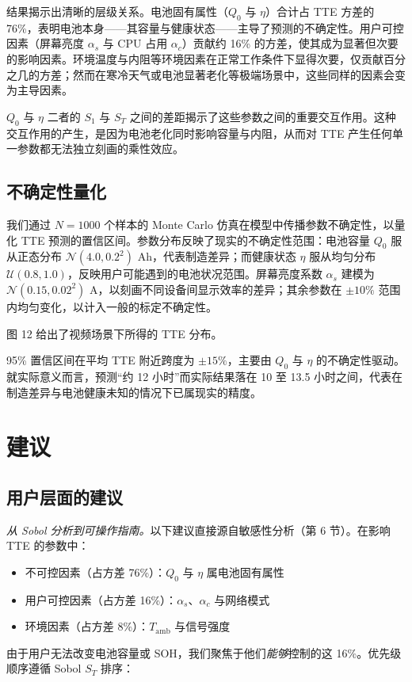 \documentclass[11pt,a4paper]{ctexart}
\begin{document}
结果揭示出清晰的层级关系。电池固有属性（$Q_0$ 与 $\eta$）合计占 TTE 方差的 76\%，表明电池本身——其容量与健康状态——主导了预测的不确定性。用户可控因素（屏幕亮度 $\alpha_s$ 与 CPU 占用 $\alpha_c$）贡献约 16\% 的方差，使其成为显著但次要的影响因素。环境温度与内阻等环境因素在正常工作条件下显得次要，仅贡献百分之几的方差；然而在寒冷天气或电池显著老化等极端场景中，这些同样的因素会变为主导因素。

$Q_0$ 与 $\eta$ 二者的 $S_1$ 与 $S_T$ 之间的差距揭示了这些参数之间的重要交互作用。这种交互作用的产生，是因为电池老化同时影响容量与内阻，从而对 TTE 产生任何单一参数都无法独立刻画的乘性效应。

\subsection{不确定性量化}

我们通过 $N = 1000$ 个样本的 Monte Carlo 仿真在模型中传播参数不确定性，以量化 TTE 预测的置信区间。参数分布反映了现实的不确定性范围：电池容量 $Q_0$ 服从正态分布 $\mathcal{N}(4.0, 0.2^2)$ Ah，代表制造差异；而健康状态 $\eta$ 服从均匀分布 $\mathcal{U}(0.8, 1.0)$，反映用户可能遇到的电池状况范围。屏幕亮度系数 $\alpha_s$ 建模为 $\mathcal{N}(0.15, 0.02^2)$ A，以刻画不同设备间显示效率的差异；其余参数在 $\pm 10\%$ 范围内均匀变化，以计入一般的标定不确定性。

图 12 给出了视频场景下所得的 TTE 分布。

95\% 置信区间在平均 TTE 附近跨度为 $\pm 15\%$，主要由 $Q_0$ 与 $\eta$ 的不确定性驱动。就实际意义而言，预测“约 12 小时”而实际结果落在 10 至 13.5 小时之间，代表在制造差异与电池健康未知的情况下已属现实的精度。

\section{建议}

\subsection{用户层面的建议}

\textit{从 Sobol 分析到可操作指南。}以下建议直接源自敏感性分析（第 6 节）。在影响 TTE 的参数中：
\begin{itemize}[leftmargin=2em]
\item 不可控因素（占方差 76\%）：$Q_0$ 与 $\eta$ 属电池固有属性
\item 用户可控因素（占方差 16\%）：$\alpha_s$、$\alpha_c$ 与网络模式
\item 环境因素（占方差 8\%）：$T_{\mathrm{amb}}$ 与信号强度
\end{itemize}
由于用户无法改变电池容量或 SOH，我们聚焦于他们\textit{能够}控制的这 16\%。优先级顺序遵循 Sobol $S_T$ 排序：
\end{document}
